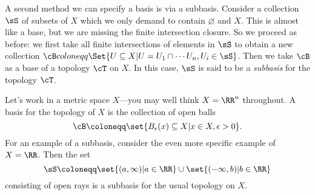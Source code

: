 \documentclass{axolotl}
\begin{document}
A second method we can specify a basis is via a subbasis. Consider a collection
\(\sS\) of subsets of \(X\) which we only demand to contain \(\varnothing\) and
\(X\). This is almost like a base, but we are missing the finite intersection closure.
So we proceed as before: we first take all finite intersections of elements in \(\sS\)
to obtain a new collection \(\cB coloneqq \Set{U \subseteq X | U = U_1 \cap
    \cdots U_n, U_i \in \sS}\). Then we take \(\cB\) as a base of a topology
\(\cT\) on \(X\). In this case, \(\sS\) is said to be a \textit{subbasis} for
the topology \(\cT\).

Let's work in a metric space \(X\)---you may well think \(X = \RR^n\) throughout.
A basis for the topology of \(X\) is the collection of open balls
\[ \cB \coloneqq \set{B_\epsilon(x) \subseteq X | x \in X, \epsilon > 0}. \]
For an example of a subbasis, consider the even more specific example of \(X = \RR\).
Then the set
\[ \sS \coloneqq \set{(a,\infty) | a \in \RR} \cup \set{(-\infty,b) | b \in \RR} \]
consisting of open rays is a subbasis for the usual topology on \(X\).
\end{document}

